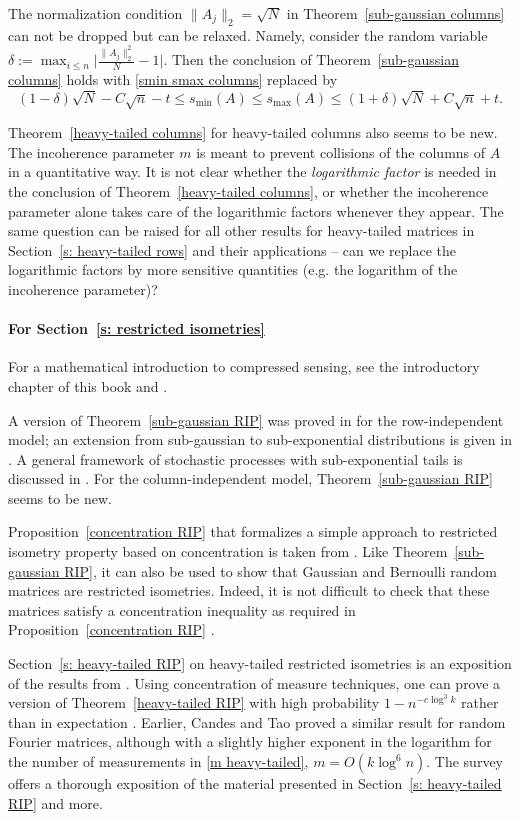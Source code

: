 \documentclass[10pt, openany]{book}
\theoremstyle{remark}
\def \d {\delta}
\def \smin {s_{\min}}
\def \smax {s_{\max}}
\begin{document}
The normalization condition $\|A_j\|_2 = \sqrt{N}$ in Theorem~\ref{sub-gaussian columns} 
can not be dropped but can be relaxed. Namely, consider the random variable
$\d := \max_{i \le n} \big| \frac{\|A_j\|_2^2}{N} - 1 \big|$.
Then the conclusion of Theorem~\ref{sub-gaussian columns} holds with \eqref{smin smax columns} replaced by 
$$
(1-\d)\sqrt{N} - C \sqrt{n} - t \le \smin(A) \le \smax(A) \le (1+\d)\sqrt{N} + C \sqrt{n} + t.
$$

Theorem~\ref{heavy-tailed columns} for heavy-tailed columns also seems to be new. 
The incoherence parameter $m$ 
is meant to prevent collisions of the columns of $A$ in a quantitative way.
It is not clear whether the {\em logarithmic factor} is needed in the conclusion
of Theorem~\ref{heavy-tailed columns}, or whether the incoherence parameter alone takes care of the
logarithmic factors whenever they appear. The same question can be raised for all other 
results for heavy-tailed matrices in Section~\ref{s: heavy-tailed rows} and their applications --
can we replace the logarithmic factors by more sensitive quantities (e.g. the logarithm 
of the incoherence parameter)?


\paragraph{For Section~\ref{s: restricted isometries}}

For a mathematical introduction to compressed sensing, see the introductory chapter of this book
and \cite{FR, CS website}. 

A version of Theorem~\ref{sub-gaussian RIP} was proved in \cite{MePaTJ} for the row-independent model; 
an extension from sub-gaussian to sub-exponential distributions is given in \cite{ALPT RIP}. 
A general framework of stochastic processes with sub-exponential tails is discussed 
in \cite{Mendelson}. 
For the column-independent model, Theorem~\ref{sub-gaussian RIP} seems to be new.

Proposition~\ref{concentration RIP} that formalizes a simple approach to restricted 
isometry property based on concentration is taken from \cite{BDDW}.
Like Theorem~\ref{sub-gaussian RIP}, it can also be used to show that 
Gaussian and Bernoulli random matrices are restricted isometries. 
Indeed, it is not difficult to check that these matrices satisfy a concentration inequality 
as required in Proposition~\ref{concentration RIP} \cite{Achlioptas}.

Section~\ref{s: heavy-tailed RIP} on heavy-tailed restricted isometries is 
an exposition of the results from \cite{RV Fourier}. 
Using concentration of measure techniques, one can prove a version of 
Theorem~\ref{heavy-tailed RIP} with high probability $1 - n^{-c \log^3 k}$ 
rather than in expectation \cite{Rauhut structured}.
Earlier, Candes and Tao \cite{Candes-Tao Fourier} proved a similar result
for random Fourier matrices, although with a slightly higher exponent
in the logarithm for the number of measurements in \eqref{m heavy-tailed},
$m = O(k \log^6 n)$.
The survey \cite{Rauhut structured} offers a thorough exposition of the material
presented in Section~\ref{s: heavy-tailed RIP} and more.
\end{document}
